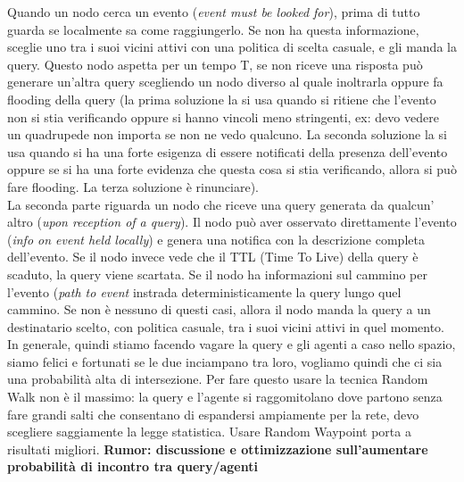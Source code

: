 \documentclass[12pt,italian]{report}
\begin{document}
Quando un nodo cerca un evento (\textit{event must be looked for}), prima di tutto guarda se localmente sa come raggiungerlo. Se non ha questa informazione, sceglie uno tra i suoi vicini attivi con una politica di scelta casuale, e gli manda la query. Questo nodo aspetta per un tempo T, se non riceve una risposta può generare un'altra query scegliendo un nodo diverso al quale inoltrarla oppure fa flooding della query (la prima soluzione la si usa quando si ritiene che l'evento non si stia verificando oppure si hanno vincoli meno stringenti, ex: devo vedere un quadrupede non importa se non ne vedo qualcuno. La seconda soluzione la si usa quando si ha una forte esigenza di essere notificati della presenza dell'evento oppure se si ha una forte evidenza che questa cosa si stia verificando, allora si può fare flooding. La terza soluzione è rinunciare). \\ La seconda parte riguarda un nodo che riceve una query generata da qualcun' altro (\textit{upon reception of a query}). Il nodo può aver osservato direttamente l'evento (\textit{info on event held locally}) e genera una notifica con la descrizione completa dell'evento. Se il nodo invece vede che il TTL (Time To Live) della query è scaduto, la query viene scartata. Se il nodo ha informazioni sul cammino per l'evento (\textit{path to event} instrada deterministicamente la query lungo quel cammino. Se non è nessuno di questi casi, allora il nodo manda la query a un destinatario scelto, con politica casuale, tra i suoi vicini attivi in quel momento. 
\bigbreak
In generale, quindi stiamo facendo vagare la query e gli agenti a caso nello spazio, siamo felici e fortunati se le due inciampano tra loro, vogliamo quindi che ci sia una probabilità alta di intersezione. Per fare questo usare la tecnica Random Walk non è il massimo: la query e l'agente si raggomitolano dove partono senza fare grandi salti che consentano di espandersi ampiamente per la rete, devo scegliere saggiamente la legge statistica. Usare Random Waypoint porta a risultati migliori.
\bigbreak
\noindent \textbf{Rumor: discussione e ottimizzazione sull'aumentare probabilità di incontro tra query/agenti} 
\end{document}
